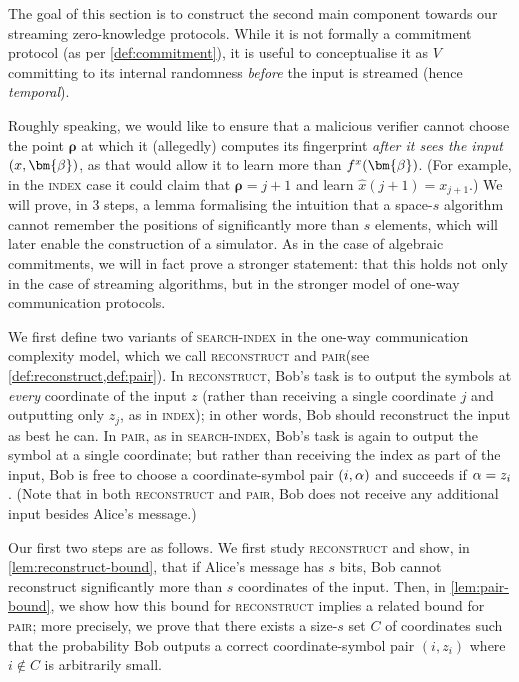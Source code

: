 \documentclass[a4paper,UKenglish,cleveref, autoref, thm-restate]{lipics-v2021}
\theoremstyle{definition}
\newcommand{\indexproblem}{\normalfont\textsc{index}\xspace}
\newcommand{\searchindex}{\normalfont\textsc{search-index}\xspace}
\newcommand{\pair}{\normalfont\textsc{pair}\xspace}
\newcommand{\reconstruct}{\normalfont\textsc{reconstruct}\xspace}
\newcommand{\vcommitstring}{z}
\newcommand{\evaluationpoint}{\bm{\fe2}}
\newcommand{\fingerprinttuple}{\bm{\rho}}
\def\fe#1{
    \ifnum#1=1
        \alpha
    \else
    \ifnum#1=2
        \beta
    \else
    \ifnum#1=3
        \gamma
    \fi\fi\fi
}
\begin{document}
The goal of this section is to construct the second main component towards our streaming zero-knowledge protocols. While it is not formally a commitment protocol (as per \cref{def:commitment}), it is useful to conceptualise it as $V$ committing to its internal randomness \emph{before} the input is streamed (hence \emph{temporal}). 

Roughly speaking, we would like to ensure that a malicious verifier cannot choose the point $\fingerprinttuple$ at which it (allegedly) computes its fingerprint \emph{after it sees the input $(x, \evaluationpoint)$}, as that would allow it to learn more than $f^x(\evaluationpoint)$. (For example, in the \indexproblem case it could claim that $\fingerprinttuple = j + 1$ and learn $\hat x(j+1) = x_{j+1}$.) We will prove, in 3 steps, a lemma formalising the intuition that a space-$s$ algorithm cannot remember the positions of significantly more than $s$ elements, which will later enable the construction of a simulator. As in the case of algebraic commitments, we will in fact prove a stronger statement: that this holds not only in the case of streaming algorithms, but in the stronger model of one-way communication protocols.

We first define two variants of \searchindex in the one-way communication complexity model, which we call \reconstruct and \pair (see \cref{def:reconstruct,def:pair}). In \reconstruct, Bob's task is to output the symbols at \emph{every} coordinate of the input $\vcommitstring$ (rather than receiving a single coordinate $j$ and outputting only $\vcommitstring_j$, as in \indexproblem); in other words, Bob should reconstruct the input as best he can. In \pair, as in \searchindex, Bob's task is again to output the symbol at a single coordinate; but rather than receiving the index as part of the input, Bob is free to choose a coordinate-symbol pair $(i, \fe1)$ and succeeds if $\fe1 = \vcommitstring_i$. (Note that in both \reconstruct and \pair, Bob does not receive any additional input besides Alice's message.)

Our first two steps are as follows. We first study \reconstruct and show, in \cref{lem:reconstruct-bound}, that if Alice's message has $s$ bits, Bob cannot reconstruct significantly more than $s$ coordinates of the input. Then, in \cref{lem:pair-bound}, we show how this bound for \reconstruct implies a related bound for \pair; more precisely, we prove that there exists a size-$s$ set $C$ of coordinates such that the probability Bob outputs a correct coordinate-symbol pair $(i, \vcommitstring_i)$ where $i \notin C$ is arbitrarily small.
\end{document}
